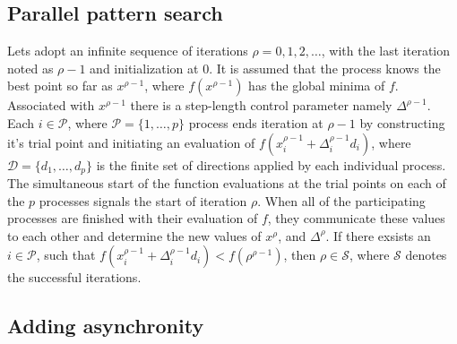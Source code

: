 \subsection{Parallel pattern search}

Lets adopt an infinite sequence of iterations $\rho=0,1,2,\dots$, with the last iteration noted as $\rho-1$ and initialization at $0$. It is assumed that the process knows the best point so far as $x^{\rho-1}$, where $f(x^{\rho-1})$ has the global minima of $f$. Associated with $x^{\rho-1}$ there is a step-length control parameter namely $\Delta^{\rho-1}$. Each $i\in\mathcal{P}$, where $\mathcal{P}=\{1,\dots,p\}$ process ends iteration at $\rho-1$ by constructing it's trial point and initiating an evaluation of $f(x^{\rho-1}_i+\Delta^{\rho-1}_id_i)$, where $\mathcal{D}=\{d_1,\dots,d_p\}$ is the finite set of directions applied by each individual process. The simultaneous start of the function evaluations at the trial points on each of the $p$ processes signals the start of iteration $\rho$. When all of the participating processes are finished with their evaluation of $f$, they communicate these values to each other and determine the new values of $x^\rho$, and $\Delta^\rho$. If there exsists an $i\in\mathcal{P}$, such that $f(x^{\rho-1}_i+\Delta^{\rho-1}_id_i)<f(\rho^{\rho-1})$, then $\rho\in\mathcal{S}$, where $\mathcal{S}$ denotes the successful iterations.

\subsection{Adding asynchronity}


